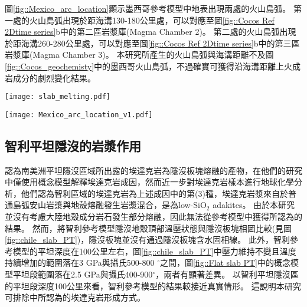 圖\ref{fig::Mexico_arc_location}顯示墨西哥參考模型中地表出現兩處的火山島弧。
第一處的火山島弧出現於距海溝130-180公里處，可以對應至圖\ref{fig::Cocos Ref 2Dtime series}b中的第二區岩漿庫(Magma Chamber 2)。
第二處的火山島弧出現於距海溝260-280公里處，可以對應至圖\ref{fig::Cocos Ref 2Dtime series}b中的第三區岩漿庫(Magma Chamber 3)。
本研究所產生的火山島弧與海溝距離不及圖\ref{fig::Cocos_geochemisty}中的墨西哥火山島弧，不過確實可獲得沿海溝距離上火成岩成分的劇烈變化結果。

\begin{figure*}[ht!]
    \centering
    \texttt{[image: slab\_melting.pdf]}
    \caption[墨西哥參考模型部分熔融源岩與岩漿庫分析]{墨西哥參考模型部分熔融源岩與岩漿庫分析。(a)同圖\ref{fig::Cocos Ref melting time}b，聚焦在13-40 Myr時期的部分熔融源岩，熔融量單位為每單位海溝產生之立方公里量中每20萬年瞬時量，模型中包含橄欖岩(綠色)、沉積岩(橘色)與榴輝岩(深藍色)熔融。灰底為平坦隱沒發生時間。(b)黃底柱狀為岩漿庫體積，藍點為榴輝岩瞬時熔融體積佔整體瞬時熔融體積的比例。
    }
    \label{fig::melting_eclogite_ratio}
\end{figure*}

\begin{figure*}[ht!]
    \centering
    \texttt{[image: Mexico\_arc\_location\_v1.pdf]}
    \caption[墨西哥參考模型火山島弧與海溝距離隨時間變化]{墨西哥參考模型火山島弧與海溝距離隨時間變化。其中咖啡色為熔融源岩以橄欖岩為主的火山島弧，藍色則為熔融源岩以沉積物與榴輝岩為主的火山島弧。
    }
    \label{fig::Mexico_arc_location}
\end{figure*}

\newpage
\subsection{智利平坦隱沒的岩漿作用}

\citet{Gutscher2000Bcan}認為南美洲平坦隱沒區域所出露的埃達克岩為隱沒板塊熔融的產物，在他們的研究中僅使用概念模型解釋埃達克岩成因，然而\citet{kay2002magmatism}近一步對埃達克岩樣本進行地球化學分析，他們認為智利區域的埃達克岩為上述成因中的第(3)種，埃達克岩漿來自於普通島弧安山岩漿與地殼熔融發生岩漿混合，是為low-SiO$_2$ adakites。
由於本研究並沒有考慮大陸地殼成分岩石發生部分熔融，因此無法從參考模型中獲得\citet{kay2002magmatism}所認為的結果。
然而，將智利參考模型隱沒地殼頂部溫壓狀態與隱沒板塊相圖比較(見圖\ref{fig::chile_slab_PT})，隱沒板塊並沒有通過隱沒板塊含水固相線。
此外，智利參考模型的平坦深度在100公里左右，圖\ref{fig::chile_slab_PT}中壓力維持不變且溫度持續增加的範圍落在3 GPa與攝氏500-800 $^{\circ}$之間，圖\ref{fig::Flat slab PT}中\citet{Gutscher2000Bcan}的概念模型平坦段範圍落在2.5 GPa與攝氏400-900$^{\circ}$，兩者有顯著差異。
以智利平坦隱沒區的平坦段深度100公里來看，智利參考模型的結果較接近真實情形。
這說明本研究可排除\citet{Gutscher2000Bcan}中所認為的埃達克岩形成方式。

